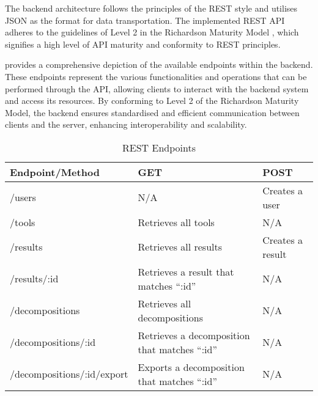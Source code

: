 The backend architecture follows the principles of the REST style and utilises
JSON as the format for data transportation. The implemented REST API adheres to
the guidelines of Level 2 in the Richardson Maturity Model
\cite{fowler-richardson-maturity-model}, which signifies a high level of API
maturity and conformity to REST principles.

 provides a comprehensive depiction of the available
endpoints within the backend. These endpoints represent the various
functionalities and operations that can be performed through the API, allowing
clients to interact with the backend system and access its resources. By
conforming to Level 2 of the Richardson Maturity Model, the backend ensures
standardised and efficient communication between clients and the server,
enhancing interoperability and scalability.

\begin{table}[!htb] \caption{REST Endpoints} \label{tab:rest_endpoints}
  \begin{center}
    \begin{tabular}[c]{p{12em}|p{12em}|p{12em}}
      \textbf{Endpoint/Method} &
      \textbf{GET} &
      \textbf{POST} \\
      \hline {/users} & N/A & Creates a user \\
      \hline {/tools} & Retrieves all tools & N/A \\
      \hline {/results} & Retrieves all results & Creates a result \\
      \hline {/results/:id} & Retrieves a result that matches ``:id'' & N/A \\
      \hline {/decompositions} & Retrieves all decompositions & N/A \\
      \hline {/decompositions/:id} & Retrieves a decomposition that matches ``:id'' & N/A \\
      \hline {/decompositions/:id/export} & Exports a decomposition that matches ``:id'' & N/A \\
    \end{tabular}
  \end{center}
\end{table}
